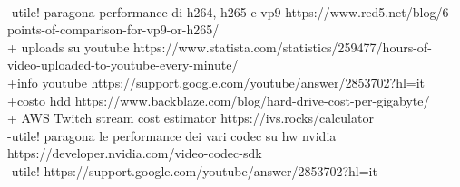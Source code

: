 \documentclass[a4paper,12pt, oneside]{article}
\begin{document}
\\-utile! paragona performance di h264, h265 e vp9 https://www.red5.net/blog/6-points-of-comparison-for-vp9-or-h265/
\\+ uploads su youtube https://www.statista.com/statistics/259477/hours-of-video-uploaded-to-youtube-every-minute/
\\+info youtube https://support.google.com/youtube/answer/2853702?hl=it
\\+costo hdd https://www.backblaze.com/blog/hard-drive-cost-per-gigabyte/
\\+ AWS Twitch stream cost estimator https://ivs.rocks/calculator
\\-utile! paragona le performance dei vari codec su hw nvidia https://developer.nvidia.com/video-codec-sdk
\\-utile! https://support.google.com/youtube/answer/2853702?hl=it
\end{document}
